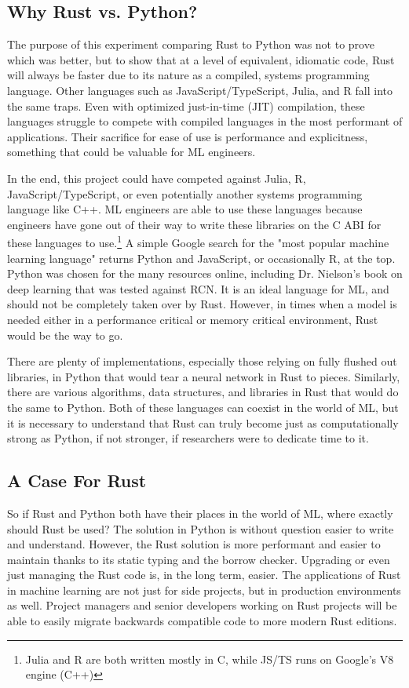 \begin{multicols}{2}
\subsection{Why Rust vs. Python?}
The purpose of this experiment comparing Rust to Python was not to prove which was better, but to show that at a level
of equivalent, idiomatic code, Rust will always be faster due to its nature as a compiled, systems programming language.
Other languages such as JavaScript/TypeScript, Julia, and R fall into the same traps. Even with optimized just-in-time (JIT)
compilation, these languages struggle to compete with compiled languages in the most performant of applications. Their
sacrifice for ease of use is performance and explicitness, something that could be valuable for ML engineers.

In the end, this project could have competed against Julia, R, JavaScript/TypeScript, or even potentially another systems
programming language like C++. ML engineers are able to use these languages because engineers have gone out of their way
to write these libraries on the C ABI for these languages to use.\footnote{Julia and R are both written mostly in C,
while JS/TS runs on Google's V8 engine (C++)} A simple Google search for the "most popular machine learning language" returns
Python and JavaScript, or occasionally R, at the top. Python was chosen for the many resources online, including
Dr. Nielson's book on deep learning that was tested against RCN. It is an ideal language for ML, and should not be
completely taken over by Rust. However, in times when a model is needed either in a performance critical or memory
critical environment, Rust would be the way to go.

There are plenty of implementations, especially those relying on fully flushed out libraries, in Python that would tear
a neural network in Rust to pieces. Similarly, there are various algorithms, data structures, and libraries in Rust that
would do the same to Python. Both of these languages can coexist in the world of ML, but it is necessary to understand
that Rust can truly become just as computationally strong as Python, if not stronger, if researchers were to dedicate
time to it.

\subsection{A Case For Rust}
So if Rust and Python both have their places in the world of ML, where exactly should Rust be used?
The solution in Python is without question easier to write and understand. However, the Rust solution is more performant
and easier to maintain thanks to its static typing and the borrow checker. Upgrading or even just managing the Rust code
is, in the long term, easier. The applications of Rust in machine learning are not just for side projects, but in
production environments as well. Project managers and senior developers working on Rust projects will be able to easily
migrate backwards compatible code to more modern Rust editions.


\end{multicols}
